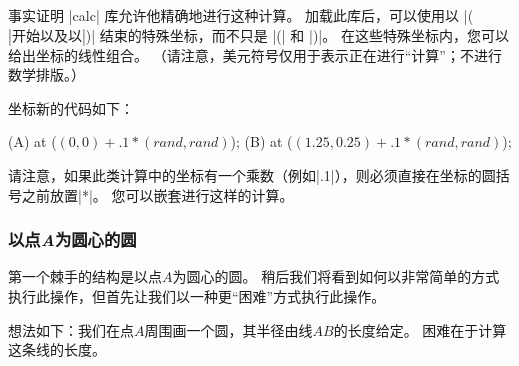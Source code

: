 事实证明 |calc| 库允许他精确地进行这种计算。 加载此库后，可以使用以 |($| 开始以及以 |$)| 结束的特殊坐标，而不只是 |(| 和 |)|。 在这些特殊坐标内，您可以给出坐标的线性组合。 （请注意，美元符号仅用于表示正在进行``计算''；不进行数学排版。）



坐标新的代码如下：

%
\begin{codeexample}
\coordinate [...] (A) at ($ (0,0) + .1*(rand,rand) $);
\coordinate [...] (B) at ($ (1.25,0.25) + .1*(rand,rand) $);
\end{codeexample}


请注意，如果此类计算中的坐标有一个乘数（例如|.1|），则必须直接在坐标的圆括号之前放置|*|。 您可以嵌套进行这样的计算。


\subsubsection{以点\emph{A}为圆心的圆}


第一个棘手的结构是以点$A$为圆心的圆。 稍后我们将看到如何以非常简单的方式执行此操作，但首先让我们以一种更``困难''方式执行此操作。


想法如下：我们在点$A$周围画一个圆，其半径由线$AB$的长度给定。 困难在于计算这条线的长度。


